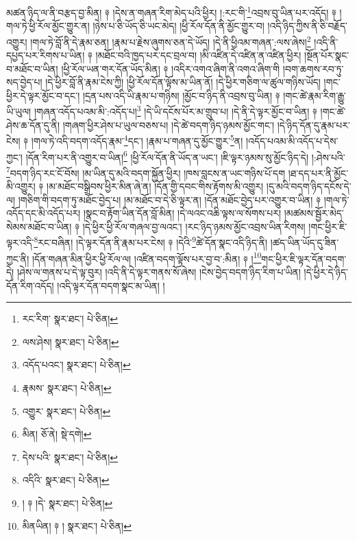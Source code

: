 མཚན་ཉིད་ལ་ནི་བརྩད་བྱ་མིན། ༈ །དེས་ན་གཞན་རིག་མེད་པའི་ཕྱིར། །:རང་གི་\footnote{རང་རིག་  སྣར་ཐང་།  པེ་ཅིན། }འབྲས་བུ་ཡིན་པར་འདོད། ༈ །གལ་ཏེ་ཕྱི་རོལ་མྱོང་གྱུར་ན། །ཉེས་པ་ཅི་ཡོད་ཅི་ཡང་མེད། །ཕྱི་རོལ་དོན་ནི་མྱོང་གྱུར་བ། །འདི་ཉིད་ཀྱིས་ནི་ཅི་བརྗོད་འགྱུར། །གལ་ཏེ་བློ་ནི་དེ་རྣམ་ཅན། །རྣམ་པ་རྗེས་ཞུགས་ཅན་དེ་ཡོད། །དེ་ནི་ཕྱིའམ་གཞན་:ལས་ཞེས།\footnote{ལས་ཤེས།  སྣར་ཐང་།  པེ་ཅིན། } །འདི་ནི་དཔྱད་པར་རིགས་པ་ཡིན། ༈ །མཐོང་བའི་ཁྱད་པར་དང་བྲལ་བ། །མི་འཛིན་དེ་འཛིན་ན་འཛིན་ཕྱིར། །སྔོན་པོར་སྣང་བ་མཐོང་བ་ཡིན། །ཕྱི་རོལ་ཡན་གར་དོན་ཡོད་མིན། ༈ །འདིར་འགའ་ཞིག་ནི་འགའ་ཞིག་གི །བག་ཆགས་རབ་ཏུ་སད་བྱེད་པ། །དེ་ཕྱིར་བློ་ནི་རྣམ་ངེས་ཀྱི། །ཕྱི་རོལ་དོན་ལྟོས་མ་ཡིན་ནོ། །དེ་ཕྱིར་གཅིག་ལ་ཚུལ་གཉིས་ཡོད། །གང་ཕྱིར་དེ་ལྟར་མྱོང་བ་དང་། །དྲན་པས་འདི་ཡི་རྣམ་པ་གཉིས། །མྱོང་བ་ཉིད་ནི་འབྲས་བུ་ཡིན། ༈ །གང་ཚེ་རྣམ་རིག་རྒྱུ་ཡི་ཡུལ། །གཞན་འདོད་པའམ་མི་:འདོད་པ།\footnote{འདོད་པའང་།  སྣར་ཐང་།  པེ་ཅིན། } །དེ་ཡི་དངོས་པོར་མ་གྲུབ་པ། །དེ་ནི་དེ་ལྟར་མྱོང་བ་ཡིན། ༈ །གང་ཚེ་ཤེས་ཆ་དོན་དུ་ནི། །གཞག་ཕྱིར་ཤེས་པ་ཡུལ་བཅས་པ། །དེ་ཚེ་བདག་ཉིད་ཉམས་མྱོང་གང་། །དེ་ཉིད་དོན་དུ་རྣམ་པར་ངེས། ༈ །གལ་ཏེ་འདི་བདག་འདོད་རྣམ་\footnote{རྣམས་  སྣར་ཐང་།  པེ་ཅིན། }དང་། །རྣམ་པ་གཞན་དུ་མྱོང་གྱུར་\footnote{འགྱུར་  སྣར་ཐང་།  པེ་ཅིན། }ན། །འདོད་པའམ་མི་འདོད་པ་དེས་ཀྱང་། །དོན་རིག་པར་ནི་འགྱུར་བ་ཡིན།\footnote{མིན།  ཅོ་ནེ།  སྡེ་དགེ། } །ཕྱི་རོལ་དོན་ནི་ཡོད་ན་ཡང་། །ཇི་ལྟར་ཉམས་སུ་མྱོང་ཉིད་དེ། །:ཤེས་པའི་\footnote{དེས་པའི་  སྣར་ཐང་།  པེ་ཅིན། }བདག་ཉིད་རང་ངོ་བོས། །མ་ཡིན་དུ་མའི་བདག་སྐྱོན་ཕྱིར། །ཁས་བླངས་ན་ཡང་གཉིས་པོ་དག །ཐ་དད་པར་ནི་མྱོང་མི་འགྱུར། ༈ །མ་མཐོང་བསྒྲིབས་ཕྱིར་མིན་ཞེ་ན། །དོན་གྱི་དབང་གིས་རྟོགས་མི་འགྱུར། །དུ་མའི་བདག་ཉིད་དངོས་དེ་ལ། །གཅིག་གི་བདག་ཏུ་མཐོང་བྱེད་པ། །མ་མཐོང་བ་དེ་ཅི་ལྟར་ན། །དོན་མཐོང་བྱེད་པར་འགྱུར་བ་ཡིན། ༈ །གལ་ཏེ་འདོད་དང་མི་འདོད་པར། །སྣང་བ་རྟོག་ཡིན་དོན་བློ་མིན། །དེ་ལའང་འཆི་ལྟས་ལ་སོགས་པར། །མཚམས་སྦྱོར་མེད་སེམས་མཐོང་བ་ཡིན། ༈ །དེ་ཕྱིར་ཕྱི་རོལ་གཞལ་བྱ་ལའང་། །རང་ཉིད་ཉམས་མྱོང་འབྲས་ཡིན་རིགས། །གང་ཕྱིར་ཇི་ལྟར་འདི་\footnote{འདིའི་  སྣར་ཐང་།  པེ་ཅིན། }རང་བཞིན། །དེ་ལྟར་དོན་ནི་རྣམ་པར་ངེས། ༈ །དེའི་\footnote{། ༈ །དེ་  སྣར་ཐང་།  པེ་ཅིན། }ཚེ་དོན་སྣང་འདི་ཉིད་ནི། །ཚད་ཡིན་ཡོད་དུ་ཟིན་ཀྱང་ནི། །དོན་གཞན་མིན་ཕྱིར་ཕྱི་རོལ་ལ། །འཛིན་བདག་ལྟོས་པར་བྱ་བ་:མིན། ༈ །\footnote{མིནཡིན། ༈ །  སྣར་ཐང་།  པེ་ཅིན། }གང་ཕྱིར་ཇི་ལྟར་དོན་བདག་དེ། །ཤེས་ལ་གནས་པ་དེ་ལྟ་བུར། །འདི་ནི་དེ་ལྟར་གནས་སོ་ཞེས། །ངེས་བྱེད་བདག་ཉིད་རིག་པ་ཡིན། །དེ་ཕྱིར་དེ་ཉིད་དོན་རིག་འདོད། །འདི་ལྟར་དོན་བདག་སྣང་མ་ཡིན། །
